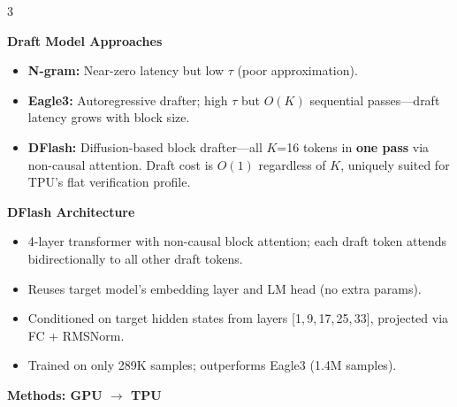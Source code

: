 \documentclass[12pt]{article}
\newcommand{\postersection}{\fontsize{32}{38}\selectfont}
\newcommand{\postersubsection}{\fontsize{26}{31}\selectfont}
\newcommand{\posterblock}[1]{%
  \vspace{6pt}%
  \noindent\colorbox{panelbg}{\parbox{\dimexpr\linewidth-2\fboxsep}{%
    \vspace{3pt}\centering\color{navy}\bfseries\postersection #1\vspace{3pt}}}%
  \vspace{3pt}\par\nobreak%
}
\begin{document}
\begin{multicols*}{3}
\vspace{3pt}
{\postersubsection\bfseries\color{navy} Draft Model Approaches\par}\vspace{1pt}
\begin{itemize}\setlength\itemsep{3pt}
  \item \textbf{N-gram:} Near-zero latency but low $\tau$ (poor approximation).
  \item \textbf{Eagle3:} Autoregressive drafter; high $\tau$ but $O(K)$
        sequential passes---draft latency grows with block size.
  \item \textbf{DFlash:} Diffusion-based block drafter---all $K$=16 tokens in
        \textbf{one pass} via non-causal attention. Draft cost is $O(1)$
        regardless of $K$, uniquely suited for TPU's flat verification profile.
\end{itemize}

\vspace{3pt}
{\postersubsection\bfseries\color{navy} DFlash Architecture\par}\vspace{1pt}
\begin{itemize}\setlength\itemsep{3pt}
  \item 4-layer transformer with non-causal block attention; each draft token
        attends bidirectionally to all other draft tokens.
  \item Reuses target model's embedding layer and LM head (no extra params).
  \item Conditioned on target hidden states from layers [1,\,9,\,17,\,25,\,33],
        projected via FC + RMSNorm.
  \item Trained on only 289K samples; outperforms Eagle3 (1.4M samples).
\end{itemize}

\posterblock{Methods: GPU $\rightarrow$ TPU}


\end{multicols*}
\end{document}
